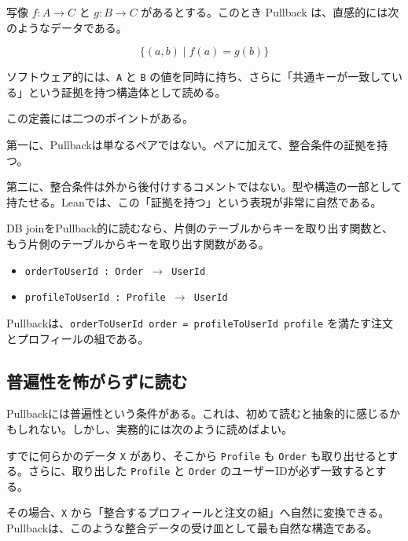 \begin{definitionbox}
写像 \(f : A \to C\) と \(g : B \to C\) があるとする。このとき Pullback は、直感的には次のようなデータである。

\[
\{(a,b) \mid f(a) = g(b)\}
\]

ソフトウェア的には、\texttt{A} と \texttt{B} の値を同時に持ち、さらに「共通キーが一致している」という証拠を持つ構造体として読める。
\end{definitionbox}

この定義には二つのポイントがある。

第一に、Pullbackは単なるペアではない。ペアに加えて、整合条件の証拠を持つ。

第二に、整合条件は外から後付けするコメントではない。型や構造の一部として持たせる。Leanでは、この「証拠を持つ」という表現が非常に自然である。

\begin{softwarebox}
DB joinをPullback的に読むなら、片側のテーブルからキーを取り出す関数と、もう片側のテーブルからキーを取り出す関数がある。

\begin{itemize}
\item \texttt{orderToUserId : Order \ensuremath{\to} UserId}
\item \texttt{profileToUserId : Profile \ensuremath{\to} UserId}
\end{itemize}

Pullbackは、\texttt{orderToUserId order = profileToUserId profile} を満たす注文とプロフィールの組である。
\end{softwarebox}


\subsection{普遍性を怖がらずに読む}

Pullbackには普遍性という条件がある。これは、初めて読むと抽象的に感じるかもしれない。しかし、実務的には次のように読めばよい。

\begin{intuitionbox}
すでに何らかのデータ \texttt{X} があり、そこから \texttt{Profile} も \texttt{Order} も取り出せるとする。さらに、取り出した \texttt{Profile} と \texttt{Order} のユーザーIDが必ず一致するとする。

その場合、\texttt{X} から「整合するプロフィールと注文の組」へ自然に変換できる。Pullbackは、このような整合データの受け皿として最も自然な構造である。
\end{intuitionbox}

